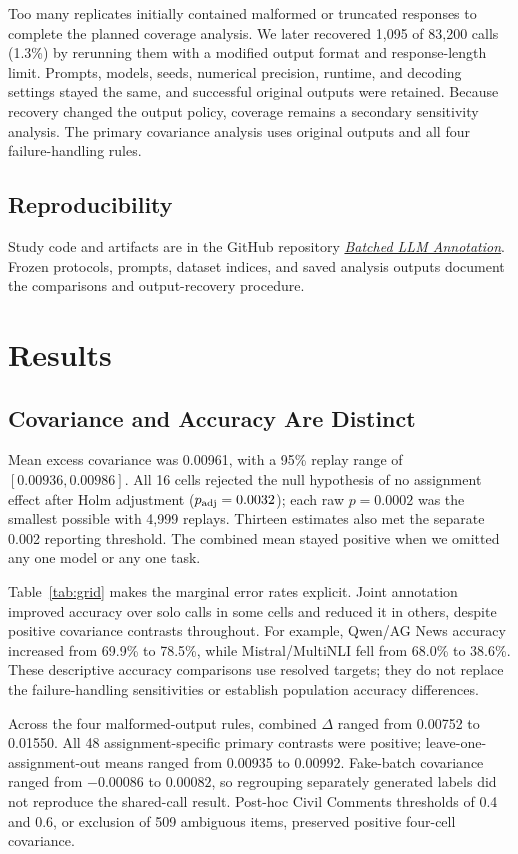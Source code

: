 \documentclass[conference]{IEEEtran}
\begin{document}
Too many replicates initially contained malformed or truncated responses to complete the planned coverage analysis. We later recovered 1,095 of 83,200 calls (1.3\%) by rerunning them with a modified output format and response-length limit. Prompts, models, seeds, numerical precision, runtime, and decoding settings stayed the same, and successful original outputs were retained. Because recovery changed the output policy, coverage remains a secondary sensitivity analysis. The primary covariance analysis uses original outputs and all four failure-handling rules.

\subsection{Reproducibility}
Study code and artifacts are in the GitHub repository
\href{https://github.com/dk2lone/batched-llm-annotation}{\textit{Batched LLM Annotation}}.
Frozen protocols, prompts, dataset indices, and saved analysis outputs document the comparisons and output-recovery procedure.

\section{Results}
\subsection{Covariance and Accuracy Are Distinct}
Mean excess covariance was 0.00961, with a 95\% replay range of $[0.00936,0.00986]$. All 16 cells rejected the null hypothesis of no assignment effect after Holm adjustment ($p_{\rm adj}=0.0032$); each raw $p=0.0002$ was the smallest possible with 4,999 replays. Thirteen estimates also met the separate 0.002 reporting threshold. The combined mean stayed positive when we omitted any one model or any one task.

Table~\ref{tab:grid} makes the marginal error rates explicit. Joint annotation improved accuracy over solo calls in some cells and reduced it in others, despite positive covariance contrasts throughout. For example, Qwen/AG News accuracy increased from 69.9\% to 78.5\%, while Mistral/MultiNLI fell from 68.0\% to 38.6\%. These descriptive accuracy comparisons use resolved targets; they do not replace the failure-handling sensitivities or establish population accuracy differences.

Across the four malformed-output rules, combined $\Delta$ ranged from 0.00752 to 0.01550. All 48 assignment-specific primary contrasts were positive; leave-one-assignment-out means ranged from 0.00935 to 0.00992. Fake-batch covariance ranged from $-0.00086$ to $0.00082$, so regrouping separately generated labels did not reproduce the shared-call result. Post-hoc Civil Comments thresholds of 0.4 and 0.6, or exclusion of 509 ambiguous items, preserved positive four-cell covariance.
\end{document}

